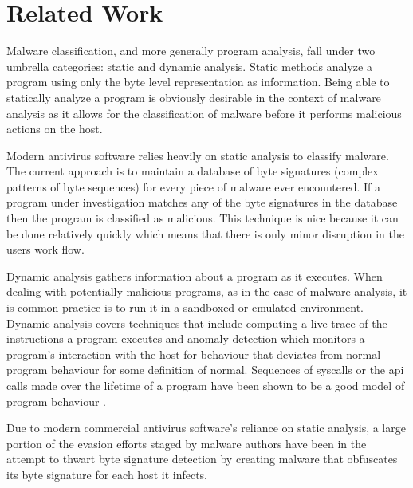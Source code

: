 \chapter{Related Work}

    Malware classification, and more generally program analysis, fall under two
    umbrella categories: static and dynamic analysis. Static methods analyze a
    program using only the byte level representation as information. Being able
    to statically analyze a program is obviously desirable in the context of
    malware analysis as it allows for the classification of malware before it
    performs malicious actions on the host.
    
    Modern antivirus software relies heavily on static analysis to classify
    malware. The current approach is to maintain a database of byte signatures
    (complex patterns of byte sequences) for every piece of malware ever
    encountered. If a program under investigation matches any of the byte
    signatures in the database then the program is classified as malicious.
    This technique is nice because it can be done relatively quickly which means
    that there is only minor disruption in the users work flow.

    Dynamic analysis gathers information about a program as it executes. When
    dealing with potentially malicious programs, as in the case of malware
    analysis, it is common practice is to run it in a sandboxed or emulated
    environment. Dynamic analysis covers techniques that include computing a
    live trace of the instructions a program executes and anomaly detection
    which monitors a program's interaction with the host for behaviour that
    deviates from normal program behaviour for some definition of normal.
    Sequences of syscalls or the api calls made over the lifetime of a program
    have been shown to be a good model of program behaviour \cite{api_calls}.

    Due to modern commercial antivirus software's reliance on static analysis,
    a large portion of the evasion efforts staged by malware authors have been
    in the attempt to thwart byte signature detection by creating malware that
    obfuscates its byte signature for each host it infects.

